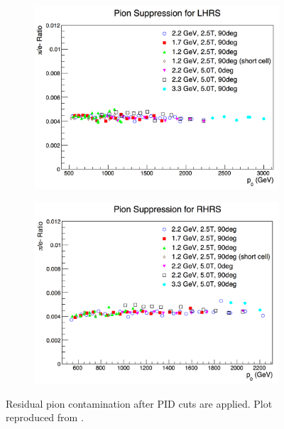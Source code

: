\begin{figure}[tb!]
  \centering
  \begin{subfigure}[t]{0.49\textwidth}
    \includegraphics[width=\textwidth]{figs/pion-suppression-left.png}
  \end{subfigure}
  \begin{subfigure}[t]{0.49\textwidth}
    \includegraphics[width=\textwidth]{figs/pion-suppression-right.png}
  \end{subfigure}
  \caption[Residual pion contamination after PID cuts are applied.]{Residual pion contamination after PID cuts are applied. Plot reproduced from \cite{Cummings2013}. \label{C7S2F5}}
\end{figure}

